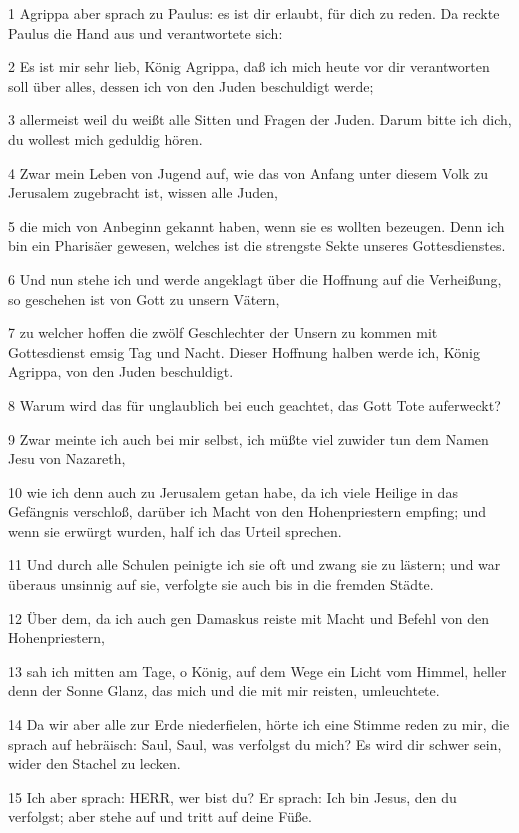 \par 1 Agrippa aber sprach zu Paulus: es ist dir erlaubt, für dich zu reden. Da reckte Paulus die Hand aus und verantwortete sich:
\par 2 Es ist mir sehr lieb, König Agrippa, daß ich mich heute vor dir verantworten soll über alles, dessen ich von den Juden beschuldigt werde;
\par 3 allermeist weil du weißt alle Sitten und Fragen der Juden. Darum bitte ich dich, du wollest mich geduldig hören.
\par 4 Zwar mein Leben von Jugend auf, wie das von Anfang unter diesem Volk zu Jerusalem zugebracht ist, wissen alle Juden,
\par 5 die mich von Anbeginn gekannt haben, wenn sie es wollten bezeugen. Denn ich bin ein Pharisäer gewesen, welches ist die strengste Sekte unseres Gottesdienstes.
\par 6 Und nun stehe ich und werde angeklagt über die Hoffnung auf die Verheißung, so geschehen ist von Gott zu unsern Vätern,
\par 7 zu welcher hoffen die zwölf Geschlechter der Unsern zu kommen mit Gottesdienst emsig Tag und Nacht. Dieser Hoffnung halben werde ich, König Agrippa, von den Juden beschuldigt.
\par 8 Warum wird das für unglaublich bei euch geachtet, das Gott Tote auferweckt?
\par 9 Zwar meinte ich auch bei mir selbst, ich müßte viel zuwider tun dem Namen Jesu von Nazareth,
\par 10 wie ich denn auch zu Jerusalem getan habe, da ich viele Heilige in das Gefängnis verschloß, darüber ich Macht von den Hohenpriestern empfing; und wenn sie erwürgt wurden, half ich das Urteil sprechen.
\par 11 Und durch alle Schulen peinigte ich sie oft und zwang sie zu lästern; und war überaus unsinnig auf sie, verfolgte sie auch bis in die fremden Städte.
\par 12 Über dem, da ich auch gen Damaskus reiste mit Macht und Befehl von den Hohenpriestern,
\par 13 sah ich mitten am Tage, o König, auf dem Wege ein Licht vom Himmel, heller denn der Sonne Glanz, das mich und die mit mir reisten, umleuchtete.
\par 14 Da wir aber alle zur Erde niederfielen, hörte ich eine Stimme reden zu mir, die sprach auf hebräisch: Saul, Saul, was verfolgst du mich? Es wird dir schwer sein, wider den Stachel zu lecken.
\par 15 Ich aber sprach: HERR, wer bist du? Er sprach: Ich bin Jesus, den du verfolgst; aber stehe auf und tritt auf deine Füße.
